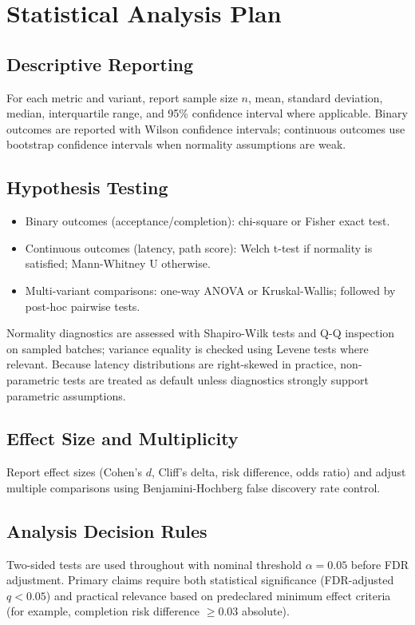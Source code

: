 \documentclass[conference]{IEEEtran}
\begin{document}
\section{Statistical Analysis Plan}
\subsection{Descriptive Reporting}
For each metric and variant, report sample size $n$, mean, standard deviation, median, interquartile range, and 95\% confidence interval where applicable. Binary outcomes are reported with Wilson confidence intervals; continuous outcomes use bootstrap confidence intervals when normality assumptions are weak.

\subsection{Hypothesis Testing}
\begin{itemize}
    \item Binary outcomes (acceptance/completion): chi-square or Fisher exact test.
    \item Continuous outcomes (latency, path score): Welch t-test if normality is satisfied; Mann-Whitney U otherwise.
    \item Multi-variant comparisons: one-way ANOVA or Kruskal-Wallis; followed by post-hoc pairwise tests.
\end{itemize}

Normality diagnostics are assessed with Shapiro-Wilk tests and Q-Q inspection on sampled batches; variance equality is checked using Levene tests where relevant. Because latency distributions are right-skewed in practice, non-parametric tests are treated as default unless diagnostics strongly support parametric assumptions.

\subsection{Effect Size and Multiplicity}
Report effect sizes (Cohen's $d$, Cliff's delta, risk difference, odds ratio) and adjust multiple comparisons using Benjamini-Hochberg false discovery rate control.

\subsection{Analysis Decision Rules}
Two-sided tests are used throughout with nominal threshold $\alpha=0.05$ before FDR adjustment. Primary claims require both statistical significance (FDR-adjusted $q<0.05$) and practical relevance based on predeclared minimum effect criteria (for example, completion risk difference $\geq 0.03$ absolute).
\end{document}
